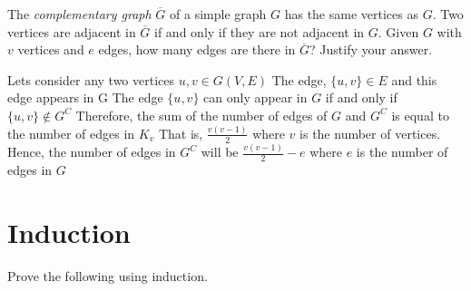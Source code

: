 \documentclass[addpoints]{exam}
\begin{document}
\begin{questions}
\question[5] The \textit{complementary graph} $\overline{G}$ of a simple graph $G$ has the same vertices as  $G$. Two vertices are adjacent in $\overline{G}$ if and only if they are not adjacent in $G$. Given $G$ with $v$ vertices and $e$ edges, how many edges are there in $\overline{G}$? Justify your answer.
  \begin{solution}
    Lets consider any two vertices $u, v \in G(V,E)$
    \newline The edge, $\{u, v\} \in E$ and this edge appears in G
    \newline The edge $\{ u, v \}$ can only appear in $G$ if and only if $\{ u, v \} \not \in G^{C}$
    \newline Therefore, the sum of the number of edges of $G$ and $G^{C}$ is equal to the number of edges in $K_{v}$
    \newline That is, $\frac{v(v-1)}{2}$ where $v$ is the number of vertices.
    \newline Hence, the number of edges in $G^{C}$ will be $\frac{v(v-1)}{2} - e$ where $e$ is the number of edges in $G$ 
  \end{solution}
  
  \section*{Induction}
  
\question Prove the following using induction.
  \begin{parts}

\end{parts}
\end{questions}
\end{document}
